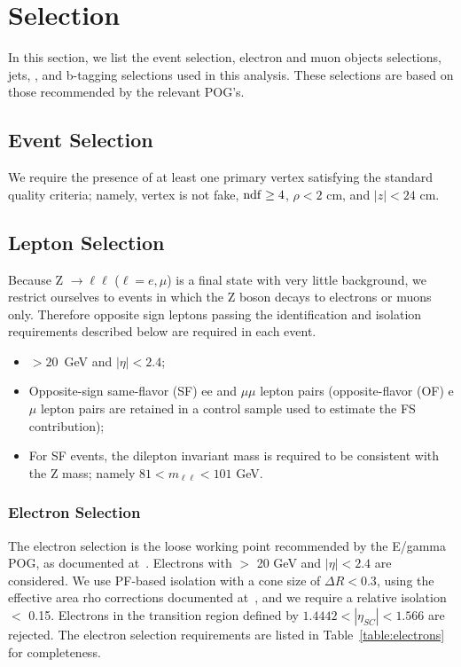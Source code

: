 \clearpage

\section{Selection}
\label{sec:eventSelection}

In this section, we list the event selection, electron and muon objects selections, jets, \MET, and b-tagging selections
used in this analysis. These selections are based on those recommended by the relevant POG's. 

\subsection{Event Selection}

We require the presence of at least one primary vertex satisfying the standard quality criteria; namely,
vertex is not fake, $\rm{ndf}\geq4$, $\rho<2$ cm, and $|z|<24$ cm.

\subsection{Lepton Selection}

Because Z $\rightarrow\ell\ell$ ($\ell=e,\mu$) is a final state with very little background,
we restrict ourselves to events in which the Z boson decays to electrons or muons only.
Therefore opposite sign leptons passing the identification and isolation requirements described below are required in each event.

\begin{itemize}
\item \pt $> 20$~GeV and $|\eta|<2.4$;
\item Opposite-sign same-flavor (SF) ee and $\mu\mu$ lepton pairs (opposite-flavor (OF) e$\mu$ lepton pairs are retained in a control 
  sample used to estimate the FS contribution);
\item For SF events, the dilepton invariant mass is required to be consistent with the Z mass; namely $81<m_{\ell\ell}<101$ GeV.
\end{itemize}

\subsubsection{Electron Selection}

The electron selection is the loose working point recommended by the E/gamma POG, as documented at~\cite{ref:Egamma}. 
Electrons with \pt $>$ 20 GeV and $|\eta|<2.4$ are considered.
We use PF-based isolation with a cone size of $\Delta R<0.3$, using the effective area rho corrections documented at~\cite{ref:Egammaiso},
and we require a relative isolation $<$ 0.15. 
Electrons in the transition region defined by $1.4442 < |\eta_{SC}| < 1.566$ are rejected.
The electron selection requirements are listed in Table~\ref{table:electrons} for completeness.

